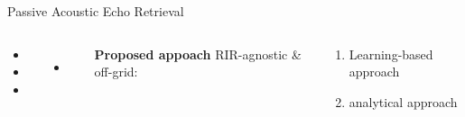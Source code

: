 \begin{frame}[t]{\alert{Passive} Acoustic Echo Retrieval \hfill\faBook}
        \vspace{1em}
        \begin{columns}[T,onlytextwidth] %
            \small
                \begin{itemize}
                    \item[\xmark] 
                    \item[\xmark] 
                    \item[\xmark] 
                \end{itemize}
                \begin{itemize}
                    \item[\xmark] 
                    \\
                \end{itemize}


                \textcolor{myred}{\textbf{Proposed appoach}} RIR-agnostic \& off-grid:
                \begin{mycontriblock}
                    \begin{enumerate}
                        \item Learning-based approach
                        \item analytical approach
                    \end{enumerate}
                \end{mycontriblock}
        \end{columns}



\end{frame}

\subsection{\lantern}

